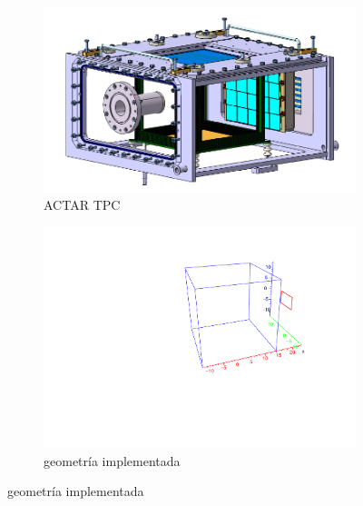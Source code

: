 \documentclass[12pt,a4paper]{article}
\numberwithin{equation}{section}
\numberwithin{figure}{section}
\begin{document}
\begin{figure}[h!] \centering
    \begin{subfigure}[b]{0.45\linewidth} \centering
        \includegraphics[scale=0.55]{actar.png}
        \caption{ACTAR TPC}
        \label{Fig:2.2.01-actar}
    \end{subfigure}
    \begin{subfigure}[b]{0.45\linewidth} \centering
        \includegraphics[scale=0.4]{geo.pdf}
        \caption{geometría implementada}
        \label{Fig:2.2.01-geometria}
    \end{subfigure}
\end{figure}
    
\end{document}
